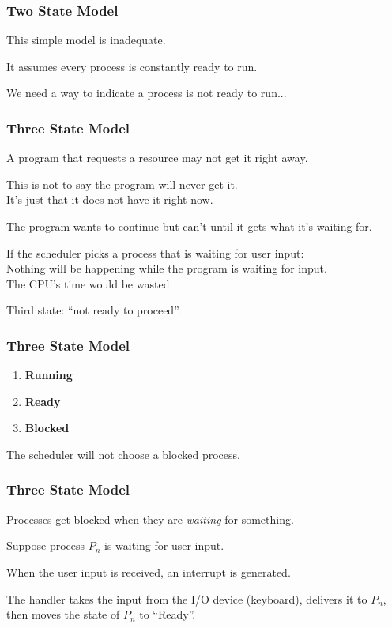 \begin{frame}
\frametitle{Two State Model}
This simple model is inadequate.

It assumes every process is constantly ready to run.

We need a way to indicate a process is not ready to run...

\end{frame}

\begin{frame}
\frametitle{Three State Model}

A program that requests a resource may not get it right away. 

This is not to say the program will never get it.\\
\quad It's just that it does not have it right now. 

The program wants to continue but can't until it gets what it's waiting for. 

If the scheduler picks a process that is waiting for user input:\\
\quad Nothing will be happening while the program is waiting for input.\\
\quad The CPU's time would be wasted. 

Third state: ``not ready to proceed''.


\end{frame}

\begin{frame}
\frametitle{Three State Model}

\begin{enumerate}
 \item \textbf{Running}
 \item \textbf{Ready}
 \item \textbf{Blocked}
\end{enumerate}

The scheduler will not choose a blocked process.

\end{frame}

\begin{frame}
\frametitle{Three State Model}

Processes get blocked when they are \textit{waiting} for something.

Suppose process $P_{n}$ is waiting for user input. 

When the user input is received, an interrupt is generated.

The handler takes the input from the I/O device (keyboard), delivers it to $P_{n}$, then moves the state of $P_{n}$ to ``Ready''.

\end{frame}

